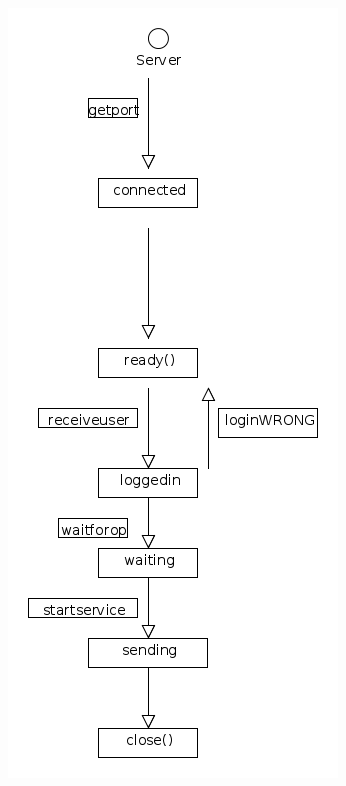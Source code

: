 \documentclass[10pt]{ps-exercise}
\begin{document}
\begin{figure}[H]
\includegraphics[scale=0.6]{server.png}
\end{figure}
\end{document}
